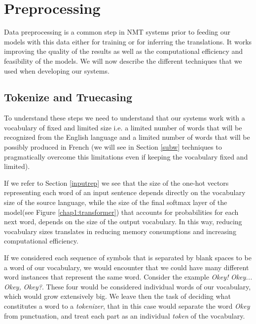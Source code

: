 \documentclass[11pt,english,listoffigures,listoftables]{tfgetsinf}
\begin{document}

\section{Preprocessing}
Data preprocessing is a common step in NMT systems prior to feeding our models with this data either for training or for inferring the translations. It works improving the quality of the results as well as the computational efficiency and feasibility of the models. We will now describe the different techniques that we used when developing our systems.

\subsection{Tokenize and Truecasing}
To understand these steps we need to understand that our systems work with a vocabulary of fixed and limited size i.e. a limited number of words that will be recognized from the English language and a limited number of words that will be possibly produced in French (we will see in Section \ref{subw} techniques to pragmatically overcome this limitations even if keeping the vocabulary fixed and limited). 

If we refer to Section \ref{inputrep} we see that the size of the one-hot vectors representing each word of an input sentence depends directly on the vocabulary size of the source language, while the size of the final softmax layer of the model(see Figure \ref{chap1:transformer}) that accounts for probabilities for each next word, depends on the size of the output vocabulary. In this way, reducing vocabulary sizes translates in reducing memory consumptions and increasing computational efficiency.

If we considered each sequence of symbols that is separated by blank spaces to be a word of our vocabulary, we would encounter that we could have many different word instances that represent the same word. Consider the example \textit{Okey!} \textit{Okey...} \textit{Okey,} \textit{Okey?}.
These four would be considered individual words of our vocabulary, which would grow extensively big. 
We leave then the task of deciding what constitutes a word to a \textit{tokenizer}, that in this case would separate the word \textit{Okey} from punctuation, and treat each part as an individual \textit{token} of the vocabulary. %
\end{document}
